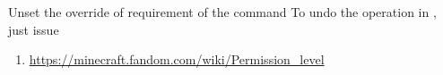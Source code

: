 \begin {example}{Unset the override of requirement of the command}
    To undo the operation in , just issue 
\end{example}


\begin{enumerate}
    \item \url{https://minecraft.fandom.com/wiki/Permission\_level}
\end{enumerate}
